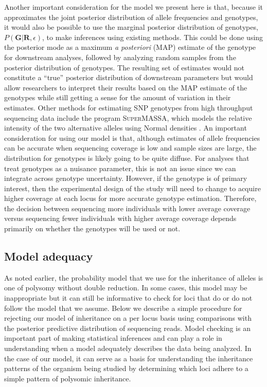 \documentclass[11pt,english,letterpaper,oneside]{article}
\begin{document}
Another important consideration for the model we present here is that, because it approximates the joint posterior distribution of allele frequencies and genotypes, it would also be possible to use the marginal posterior distribution of genotypes, $P(\bm{G}|\bm{R},\epsilon)$, to make inferences using existing methods. This could be done using the posterior mode as a maximum \textit{a posteriori} (MAP) estimate of the genotype for downstream analyses, followed by analyzing random samples from the posterior distribution of genotypes. The resulting set of estimates would not constitute a ``true'' posterior distribution of downstream parameters but would allow researchers to interpret their results based on the MAP estimate of the genotypes while still getting a sense for the amount of variation in their estimates. Other methods for estimating SNP genotypes from high throughput sequencing data include the program \textsc{SuperMASSA}, which models the relative intensity of the two alternative alleles using Normal densities \citep{serang2012supermassa}. An important consideration for using our model is that, although estimates of allele frequencies can be accurate when sequencing coverage is low and sample sizes are large, the distribution for genotypes is likely going to be quite diffuse. For analyses that treat genotypes as a nuisance parameter, this is not an issue since we can integrate across genotype uncertainty. However, if the genotype is of primary interest, then the experimental design of the study will need to change to acquire higher coverage at each locus for more accurate genotype estimation. Therefore, the decision between sequencing more individuals with lower average coverage versus sequencing fewer individuals with higher average coverage depends primarily on whether the genotypes will be used or not.

\medskip
\subsection*{Model adequacy}
\medskip

As noted earlier, the probability model that we use for the inheritance of alleles is one of polysomy without double reduction. In some cases, this model may be inappropriate but it can still be informative to check for loci that do or do not follow the model that we assume. Below we describe a simple procedure for rejecting our model of inheritance on a per locus basis using comparisons with the posterior predictive distribution of sequencing reads. Model checking is an important part of making statistical inferences and can play a role in understanding when a model adequately describes the data being analyzed. In the case of our model, it can serve as a basis for understanding the inheritance patterns of the organism being studied by determining which loci adhere to a simple pattern of polysomic inheritance. 
\medskip
\end{document}

